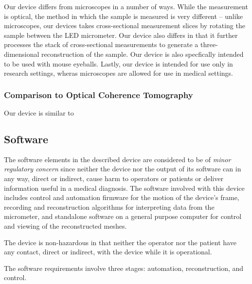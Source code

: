 \documentclass{article}
\begin{document}
Our device differs from microscopes in a number of ways. While the
measurement is optical, the method in which the sample is measured is
very different -- unlike microscopes, our devices takes
cross-sectional measurement slices by rotating the sample between the
LED micrometer. Our device also differs in that it further processes
the stack of cross-sectional measurements to generate a
three-dimensional reconstruction of the sample. Our device is also
specfically intended to be used with mouse eyeballs. Lastly, our
device is intended for use only in research settings, wheras
microscopes are allowed for use in medical settings.

\subsubsection{Comparison to Optical Coherence Tomography}
Our device is similar to 





\subsection{Software}

The software elements in the described device are considered to be of
\textit{minor regulatory concern} since neither the device nor the
output of its software can in any way, direct or indirect, cause harm
to operators or patients or deliver information useful in a medical
diagnosis. The software involved with this device includes control and
automation firmware for the motion of the device's frame, recording
and reconstruction algorithms for interpreting data from the
micrometer, and standalone software on a general purpose computer for
control and viewing of the reconstructed meshes.

The device is non-hazardous in that neither the operator nor the
patient have any contact, direct or indirect, with the device while it
is operational.

The software requirements involve three stages: automation,
reconstruction, and control. 
\end{document}
